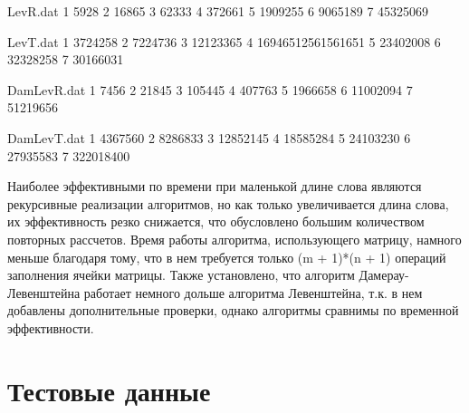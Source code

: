 \documentclass[12pt]{report}
\begin{document}
\begin{filecontents}{LevR.dat}
1 5928
2 16865
3 62333
4 372661
5 1909255
6 9065189
7 45325069
\end{filecontents}

\begin{filecontents}{LevT.dat}
1 3724258
2 7224736
3 12123365
4 16946512561561651
5 23402008
6 32328258
7 30166031
\end{filecontents}

\begin{filecontents}{DamLevR.dat}
1 7456
2 21845
3 105445
4 407763
5 1966658
6 11002094
7 51219656
\end{filecontents}

\begin{filecontents}{DamLevT.dat}
1 4367560
2 8286833
3 12852145
4 18585284
5 24103230
6 27935583
7 322018400
\end{filecontents}



\par
Наиболее эффективными по времени при маленькой длине слова являются рекурсивные реализации алгоритмов, но как только увеличивается длина слова, их эффективность резко снижается, что обусловлено большим количеством повторных рассчетов. Время работы алгоритма, использующего матрицу, намного меньше благодаря тому, что в нем требуется только (m + 1)*(n + 1) операций заполнения ячейки матрицы. Также установлено, что алгоритм Дамерау-Левенштейна работает немного дольше алгоритма Левенштейна, т.к. в нем добавлены дополнительные проверки, однако алгоритмы сравнимы по временной эффективности.

\section{Тестовые данные}
\end{document}
